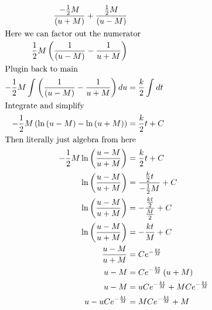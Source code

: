 \documentclass[12pt]{article}
\begin{document}
\begin{align}
  \frac{-\frac{1}{2}M}{\left(u+M\right)}+\frac{\frac{1}{2}M}{\left(u-M\right)}                                                                                          \\
  \intertext{Here we can factor out the numerator}
  \frac{1}{2}M\left(\frac{1}{\left(u-M\right)}-\frac{1}{u+M}\right)                                                                                                     \\
  \intertext{Plugin back to main}
  -\frac{1}{2}M\int_{ }^{ }\left(\frac{1}{\left(u-M\right)}-\frac{1}{u+M}\right)du & =\frac{k}{2}\int_{ }^{ }dt                                                         \\
  \intertext{Integrate and simplify}
  -\frac{1}{2}M\left(\ln\left(u-M\right)-\ln\left(u+M\right)\right)                & =\frac{k}{2}t+C                                                                    \\
  \intertext{Then literally just algebra from here}
  -\frac{1}{2}M\ln\left(\frac{u-M}{u+M}\right)                                     & =\frac{k}{2}t+C                                                                    \\
  \ln\left(\frac{u-M}{u+M}\right)                                                  & =\frac{\frac{k}{2}t}{-\frac{1}{2}M}+C                                              \\
  \ln\left(\frac{u-M}{u+M}\right)                                                  & =-\frac{\frac{kt}{2}}{\frac{M}{2}}+C                                               \\
  \ln\left(\frac{u-M}{u+M}\right)                                                  & =-\frac{kt}{M}+C                                                                   \\
  \frac{u-M}{u+M}                                                                  & =Ce^{-\frac{kt}{M}}                                                                \\
  u-M                                                                              & =Ce^{-\frac{kt}{M}}\left(u+M\right)                                                \\
  u-M                                                                              & =uCe^{-\frac{kt}{M}}+MCe^{-\frac{kt}{M}}                                           \\
  u-uCe^{-\frac{kt}{M}}                                                            & =MCe^{-\frac{kt}{M}}+M                                                             \\

\end{align}
\end{document}
